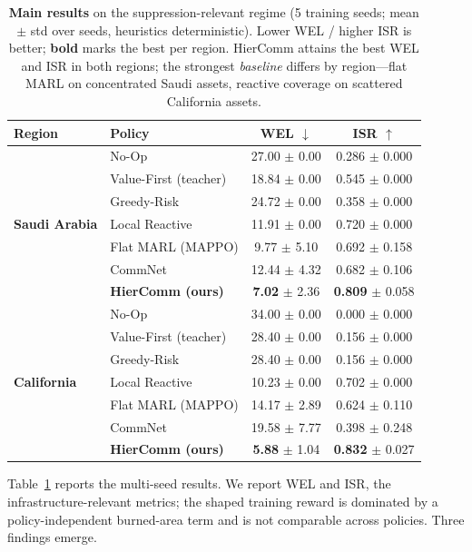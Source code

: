 \documentclass[letterpaper]{article}
\begin{document}
\begin{table}[t]
\centering
\caption{\textbf{Main results} on the suppression-relevant regime (5 training seeds; mean $\pm$ std over seeds, heuristics deterministic). Lower WEL / higher ISR is better; \textbf{bold} marks the best per region. HierComm attains the best WEL and ISR in both regions; the strongest \emph{baseline} differs by region---flat MARL on concentrated Saudi assets, reactive coverage on scattered California assets.}
\label{tab:main_results}
\vspace{0.5em}
\begin{tabular}{llcc}
\toprule
Region & Policy & WEL $\downarrow$ & ISR $\uparrow$ \\
\midrule
\multirow{7}{*}{\textbf{Saudi Arabia}}
& No-Op & 27.00 $\pm$ 0.00 & 0.286 $\pm$ 0.000 \\
& Value-First (teacher) & 18.84 $\pm$ 0.00 & 0.545 $\pm$ 0.000 \\
& Greedy-Risk & 24.72 $\pm$ 0.00 & 0.358 $\pm$ 0.000 \\
& Local Reactive & 11.91 $\pm$ 0.00 & 0.720 $\pm$ 0.000 \\
& Flat MARL (MAPPO) & 9.77 $\pm$ 5.10 & 0.692 $\pm$ 0.158 \\
& CommNet & 12.44 $\pm$ 4.32 & 0.682 $\pm$ 0.106 \\
& \textbf{HierComm (ours)} & \textbf{7.02} $\pm$ 2.36 & \textbf{0.809} $\pm$ 0.058 \\
\midrule
\multirow{7}{*}{\textbf{California}}
& No-Op & 34.00 $\pm$ 0.00 & 0.000 $\pm$ 0.000 \\
& Value-First (teacher) & 28.40 $\pm$ 0.00 & 0.156 $\pm$ 0.000 \\
& Greedy-Risk & 28.40 $\pm$ 0.00 & 0.156 $\pm$ 0.000 \\
& Local Reactive & 10.23 $\pm$ 0.00 & 0.702 $\pm$ 0.000 \\
& Flat MARL (MAPPO) & 14.17 $\pm$ 2.89 & 0.624 $\pm$ 0.110 \\
& CommNet & 19.58 $\pm$ 7.77 & 0.398 $\pm$ 0.248 \\
& \textbf{HierComm (ours)} & \textbf{5.88} $\pm$ 1.04 & \textbf{0.832} $\pm$ 0.027 \\
\bottomrule
\end{tabular}
\end{table}

Table~\ref{tab:main_results} reports the multi-seed results. We report WEL and ISR, the infrastructure-relevant metrics; the shaped training reward is dominated by a policy-independent burned-area term and is not comparable across policies. Three findings emerge.
\end{document}
